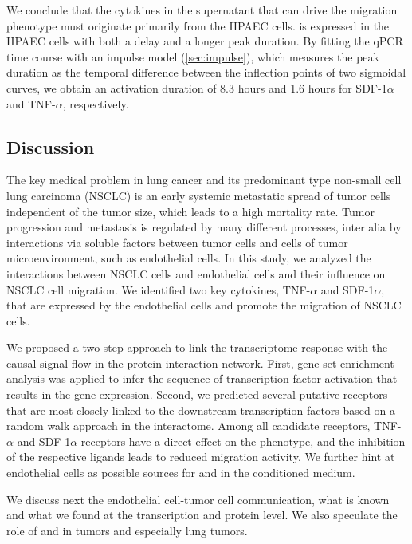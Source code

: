 We conclude that the cytokines in the supernatant that can drive the migration
phenotype
must originate primarily from the HPAEC cells.  
\sdfonea is expressed in the HPAEC cells with both a delay and a longer peak duration.
By fitting the qPCR time course with an impulse model 
(\ref{sec:impulse}), which measures the peak 
duration as the 
temporal difference between the inflection points of two
sigmoidal curves, 
we obtain an activation duration of  8.3 hours and 1.6 hours for SDF-1$\alpha$
and TNF-$\alpha$, respectively.

\clearpage
\subsection{Discussion}

The key medical problem in lung cancer and its predominant type non-small 
cell lung carcinoma (NSCLC) is an early systemic metastatic spread of tumor cells 
independent of the tumor size, which leads to a high mortality rate. Tumor progression 
and metastasis is regulated by many different processes, inter alia by interactions 
via soluble factors between tumor cells and cells of tumor microenvironment, such as 
endothelial cells. In this study, we analyzed the interactions between NSCLC cells 
and endothelial cells and their influence on NSCLC cell migration. We identified 
two key cytokines, TNF-$\alpha$ and SDF-1$\alpha$, that are expressed by the 
endothelial cells and promote the migration of NSCLC cells.

We proposed a two-step approach to link the transcriptome response
with the causal signal flow in the protein interaction network. First, gene set
enrichment analysis was applied to infer the sequence of transcription factor
activation that results in the gene expression. Second, we predicted several
putative receptors that are most closely linked to the downstream transcription
factors based on 
a random walk approach in the interactome. Among all candidate receptors,
TNF-$\alpha$ and SDF-1$\alpha$ receptors have a direct effect on the phenotype,
and the inhibition of the respective ligands leads to reduced migration 
activity. We further
hint at endothelial cells as possible sources for \tnfa and \sdfonea in the conditioned medium.

We discuss next the endothelial cell-tumor cell communication, what is known and what we found at the transcription and protein level.
We also speculate the role of \tnfa and \sdfonea in tumors and especially lung tumors.

